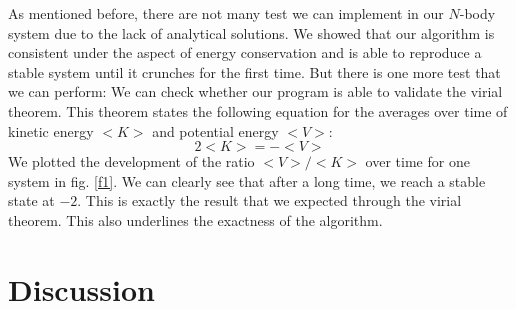 \documentclass[10pt,a4paper]{article}
\begin{document}
As mentioned before, there are not many test we can implement in our $N$-body system due to the lack of analytical solutions. We showed that our algorithm is consistent under the aspect of energy conservation and is able to reproduce a stable system until it crunches for the first time. But there is one more test that we can perform: We can check whether our program is able to validate the virial theorem. This theorem states the following equation for the averages over time of kinetic energy $<K>$ and potential energy $<V>$:
\begin{equation}
2<K>=-<V>
\end{equation}
We plotted the development of the ratio $<V>/<K>$ over time for one system in fig. \ref{f1}. We can clearly see that after a long time, we reach a stable state at $-2$. This is exactly the result that we expected through the virial theorem. This also underlines the exactness of the algorithm.



\clearpage
\section{Discussion}
\end{document}
